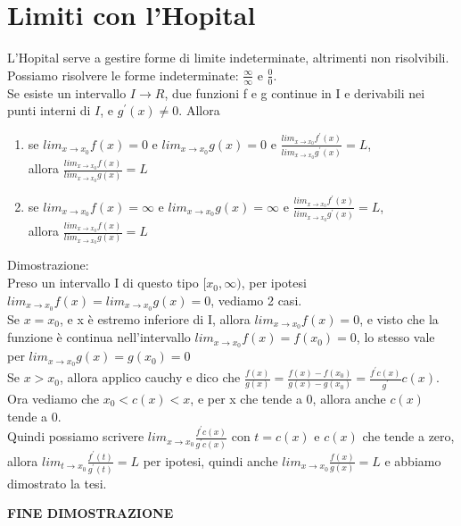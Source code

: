 \documentclass[11pt]{article}
\begin{document}
\section{Limiti con l'Hopital}
L'Hopital serve a gestire forme di limite indeterminate, altrimenti non risolvibili.\\
Possiamo risolvere le forme indeterminate: $\frac{\infty}{\infty}$ e $\frac{0}{0}$.\\
Se esiste un intervallo $I \rightarrow R$, due funzioni f e g continue in I e derivabili nei punti interni di $I$, e $g^{'}(x) \neq 0$. Allora
\begin{enumerate}
    \item se $lim_{x \rightarrow x_{0}}f(x) = 0$ e $lim_{x \rightarrow x_{0}}g(x) = 0$ e 
    $\frac{lim_{x \rightarrow x_{0}}f^{'}(x)}{lim_{x \rightarrow x_{0}}g^{'}(x)} = L$,\\ allora 
    $\frac{lim_{x \rightarrow x_{0}}f(x)}{lim_{x \rightarrow x_{0}}g(x)} = L$
    \item se $lim_{x \rightarrow x_{0}}f(x) = \infty$ e $lim_{x \rightarrow x_{0}}g(x) = \infty$ e 
    $\frac{lim_{x \rightarrow x_{0}}f^{'}(x)}{lim_{x \rightarrow x_{0}}g^{'}(x)} = L$,\\ allora 
    $\frac{lim_{x \rightarrow x_{0}}f(x)}{lim_{x \rightarrow x_{0}}g(x)} = L$
\end{enumerate}
Dimostrazione:\\
Preso un intervallo I di questo tipo $[x_{0},\infty)$, per ipotesi $lim_{x \rightarrow x_{0}}f(x) = lim_{x \rightarrow x_{0}}g(x) = 0$, vediamo 2 casi.\\
Se $x = x_{0}$, e x è estremo inferiore di I, allora $lim_{x \rightarrow x_{0}}f(x) = 0$, e visto che la funzione è continua nell'intervallo $lim_{x \rightarrow x_{0}}f(x) = f(x_{0}) = 0$, 
lo stesso vale per $lim_{x \rightarrow x_{0}}g(x) = g(x_{0}) = 0$\\
Se $x > x_{0}$, allora applico cauchy e dico che $\frac{f(x)}{g(x)} = \frac{f(x)-f(x_{0})}{g(x)-g(x_{0})} = \frac{f^{'}c(x)}{g^{'}}c(x)$.\\
Ora vediamo che $x_{0} < c(x) < x$, e per x che tende a 0, allora anche $c(x)$ tende a 0.\\
Quindi possiamo scrivere $lim_{x \rightarrow x_{0}}\frac{f^{'}c(x)}{g^{'}c(x)}$ con $t = c(x)$ e $c(x)$ che tende a zero, allora $lim_{t \rightarrow x_{0}}\frac{f^{'}(t)}{g^{'}(t)} = L$ per ipotesi, 
quindi anche $lim_{x \rightarrow x_{0}}\frac{f(x)}{g(x)} = L$ e abbiamo dimostrato la tesi.\\
\begin{center}
    \textbf{FINE DIMOSTRAZIONE}
\end{center}
\end{document}
